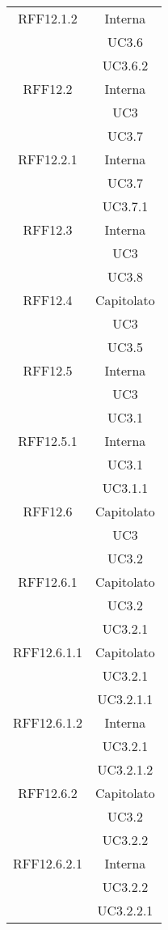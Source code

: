 \begin{longtable}{|c|c|}
\midrule
RFF12.1.2
& Interna\\
& UC3.6\\
& UC3.6.2\\

\midrule
RFF12.2
& Interna\\
& UC3\\
& UC3.7\\

\midrule
RFF12.2.1
& Interna\\
& UC3.7\\
& UC3.7.1\\

\midrule
RFF12.3
& Interna\\
& UC3\\
& UC3.8\\

\midrule
RFF12.4
& Capitolato\\
& UC3\\
& UC3.5\\

\midrule
RFF12.5
& Interna\\
& UC3\\
& UC3.1\\

\midrule
RFF12.5.1
& Interna\\
& UC3.1\\
& UC3.1.1\\

\midrule
RFF12.6
& Capitolato\\
& UC3\\
& UC3.2\\

\midrule
RFF12.6.1
& Capitolato\\
& UC3.2\\
& UC3.2.1\\

\midrule
RFF12.6.1.1
& Capitolato\\
& UC3.2.1\\
& UC3.2.1.1\\

\midrule
RFF12.6.1.2
& Interna\\
& UC3.2.1\\
& UC3.2.1.2\\


\midrule
RFF12.6.2
& Capitolato\\
& UC3.2\\
& UC3.2.2\\

\midrule
RFF12.6.2.1
& Interna\\
& UC3.2.2\\
& UC3.2.2.1\\


\end{longtable}
